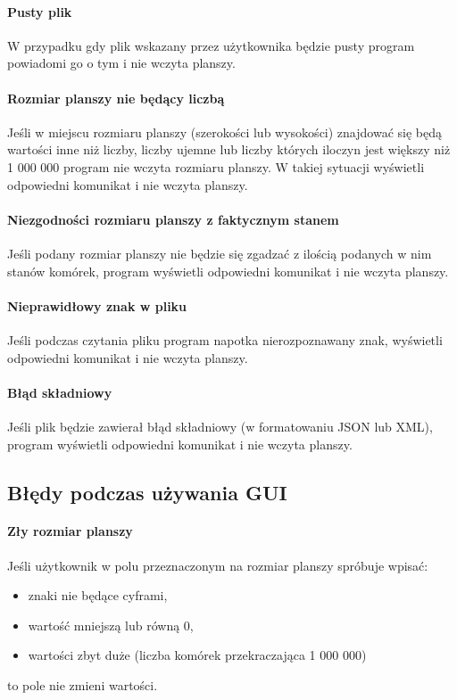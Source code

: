 \documentclass{report}
\begin{document}
\paragraph{Pusty plik}
W przypadku gdy plik wskazany przez użytkownika będzie pusty program powiadomi go o tym i nie wczyta planszy.

\paragraph{Rozmiar planszy nie będący liczbą}
Jeśli w miejscu rozmiaru planszy (szerokości lub wysokości) znajdować się będą wartości inne niż liczby, liczby ujemne lub liczby których iloczyn jest większy niż 1 000 000 program nie wczyta rozmiaru planszy. W takiej sytuacji wyświetli odpowiedni komunikat i nie wczyta planszy.
 
 \paragraph{Niezgodności rozmiaru planszy z faktycznym stanem}
 Jeśli podany rozmiar planszy nie będzie się zgadzać z ilością podanych w nim stanów komórek, program wyświetli odpowiedni komunikat i nie wczyta planszy.
 
 \paragraph{Nieprawidłowy znak w pliku}
 Jeśli podczas czytania pliku program napotka nierozpoznawany znak, wyświetli odpowiedni komunikat i nie wczyta planszy.
 
 \paragraph{Błąd składniowy}
 Jeśli plik będzie zawierał błąd składniowy (w formatowaniu JSON lub XML), program wyświetli odpowiedni komunikat i nie wczyta planszy.
 
\subsection{Błędy podczas używania GUI}
\paragraph{Zły rozmiar planszy}
Jeśli użytkownik w polu przeznaczonym na rozmiar planszy spróbuje wpisać:
\begin{itemize}
	\item znaki nie będące cyframi,
	\item wartość mniejszą lub równą 0,
	\item wartości zbyt duże (liczba komórek przekraczająca 1 000 000)
\end{itemize}
to pole nie zmieni wartości.
\end{document}
